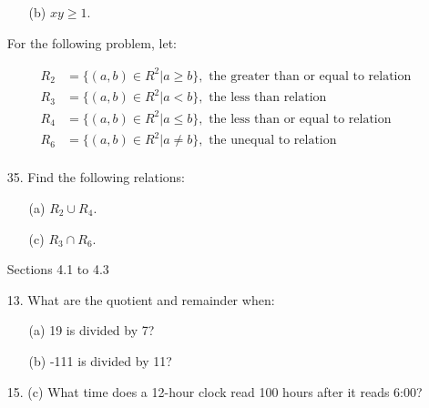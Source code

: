 \documentclass[12pt]{article}
\newcommand\bufprob{\vspace{2.0in}}
\newcommand\bufsub{\vspace{1.0in}}
\begin{document}
\begin{enumerate}
\begin{enumerate}
\item[(b)] $xy \geq 1$.

\end{enumerate}
%

\bufprob



For the following problem, let:

\begin{align*}
    R_2 &= \{ (a,b) \in R^2 | a \geq b \}, \text{ the greater than or equal to relation} \\
    R_3 &= \{ (a, b) \in R^2 | a < b \}, \text{ the less than relation} \\
    R_4 &= \{ (a, b) \in R^2 | a \leq b \}, \text{ the less than or equal to relation} \\
    R_6 &= \{ (a, b) \in R^2 | a \neq b \}, \text{ the unequal to relation} \\
\end{align*}

\item[35.] Find the following relations:

\begin{enumerate}
    \item[(a)] $R_2 \cup R_4$.
    
    
    \item[(c)] $R_3 \cap R_6$.
    
    
\end{enumerate}

\newpage

\begin{center}
    {\large Sections 4.1 to 4.3}
\end{center}



\item[13.]  What are the quotient and remainder when:

\begin{enumerate}
    \item[(a)] 19 is divided by 7?
    
    
    \item[(b)] -111 is divided by 11?
    
    
\end{enumerate}
\bufsub


\item[15. (c)] What time does a 12-hour clock read 100 hours after it reads 6:00?
\bufsub 


\end{enumerate}
\end{document}

